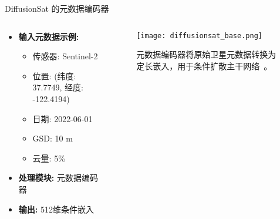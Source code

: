 \begin{refsection}
  \begin{frame}{DiffusionSat 的元数据编码器}
    \begin{columns}[t]
      \begin{column}{0.4\textwidth}
        \small
        \begin{itemize}
          \item \textbf{输入元数据示例:}
          \begin{itemize}
            \item 传感器: Sentinel-2
            \item 位置: (纬度: 37.7749, 经度: -122.4194)
            \item 日期: 2022-06-01
            \item GSD: 10 m
            \item 云量: 5\%
          \end{itemize}
          \item \textbf{处理模块:} 元数据编码器
          \item \textbf{输出:} 512维条件嵌入
        \end{itemize}
      \end{column}
      \begin{column}{0.6\textwidth}
        \begin{figure}
          \centering
          \texttt{[image: diffusionsat\_base.png]}
          \caption{\scriptsize 元数据编码器将原始卫星元数据转换为定长嵌入，用于条件扩散主干网络~\parencite{diffusionset2024}。}
        \end{figure}
      \end{column}
    \end{columns}
    \bottomleftrefs
  \end{frame}
\end{refsection}

